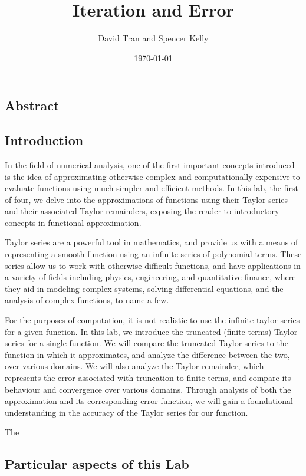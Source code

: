 \documentclass[letter,11pt]{article}
\title{Iteration and Error}
\author{David Tran and Spencer Kelly}
\date{\today}
\begin{document}
\maketitle

\subsection*{Abstract}

\subsection*{Introduction}
In the field of numerical analysis, one of the first important concepts introduced is the idea of approximating otherwise complex and computationally expensive to evaluate functions using much simpler and efficient methods.
In this lab, the first of four, we delve into the approximations of functions using their Taylor series and their associated Taylor remainders, exposing the reader to introductory concepts in functional approximation.

Taylor series are a powerful tool in mathematics, and provide us with a means of representing a smooth function using an infinite series of polynomial terms.
These series allow us to work with otherwise difficult functions, and have applications in a variety of fields including physics, engineering, and quantitative finance, where they aid in modeling complex systems, solving differential equations, and the analysis of complex functions, to name a few.

For the purposes of computation, it is not realistic to use the infinite taylor series for a given function.
In this lab, we introduce the truncated (finite terms) Taylor series for a single function.
We will compare the truncated Taylor series to the function in which it approximates, and analyze the difference between the two, over various domains.
We will also analyze the Taylor remainder, which represents the error associated with truncation to finite terms, and compare its behaviour and convergence over various domains.
Through analysis of both the approximation and its corresponding error function, we will gain a foundational understanding in the accuracy of the Taylor series for our function.

The

\subsection*{Particular aspects of this Lab }
\end{document}
